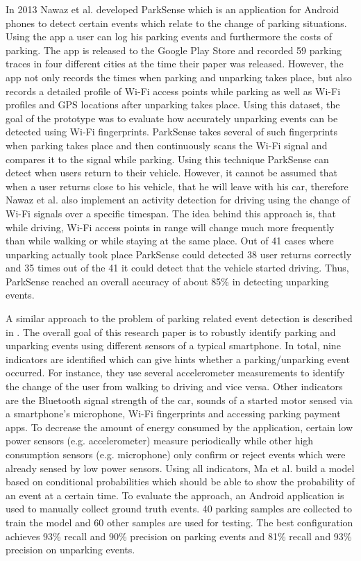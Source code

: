 In 2013 Nawaz et al. developed ParkSense \cite{Nawaz:2013:PSB:2500423.2500438} which is an application for Android phones to detect certain events which relate to the change of parking situations. Using the app a user can log his parking events and furthermore the costs of parking. The app is released to the Google Play Store and recorded 59 parking traces in four different cities at the time their paper was released. However, the app not only records the times when parking and unparking takes place, but also records a detailed profile of Wi-Fi access points while parking as well as Wi-Fi profiles and GPS locations after unparking takes place. Using this dataset, the goal of the prototype was to evaluate how accurately unparking events can be detected using Wi-Fi fingerprints. ParkSense takes several of such fingerprints when parking takes place and then continuously scans the Wi-Fi signal and compares it to the signal while parking. Using this technique ParkSense can detect when users return to their vehicle. However, it cannot be assumed that when a user returns close to his vehicle, that he will leave with his car, therefore Nawaz et al. also implement an activity detection for driving using the change of Wi-Fi signals over a specific timespan. The idea behind this approach is, that while driving, Wi-Fi access points in range will change much more frequently than while walking or while staying at the same place. Out of 41 cases where unparking actually took place ParkSense could detected 38 user returns correctly and 35 times out of the 41 it could detect that the vehicle started driving. Thus, ParkSense reached an overall accuracy of about 85\% in detecting unparking events.

A similar approach to the problem of parking related event detection is described in \cite{Ma:2014:USP:2674918.2674929}. The overall goal of this research paper is to robustly identify parking and unparking events using different sensors of a typical smartphone. In total, nine indicators are identified which can give hints whether a parking/unparking event occurred. For instance, they use several accelerometer measurements to identify the change of the user from walking to driving and vice versa. Other indicators are the Bluetooth signal strength of the car, sounds of a started motor sensed via a smartphone's microphone, Wi-Fi fingerprints and accessing parking payment apps. To decrease the amount of energy consumed by the application, certain low power sensors (e.g. accelerometer) measure periodically while other high consumption sensors (e.g. microphone) only confirm or reject events which were already sensed by low power sensors. Using all indicators, Ma et al. build a model based on conditional probabilities which should be able to show the probability of an event at a certain time. To evaluate the approach, an Android application is used to manually collect ground truth events. 40 parking samples are collected to train the model and 60 other samples are used for testing. The best configuration achieves 93\% recall and 90\% precision on parking events and 81\% recall and 93\% precision on unparking events.


